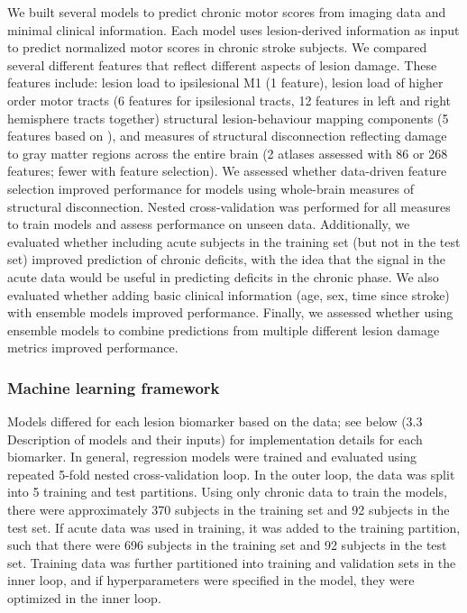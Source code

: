 \documentclass[phd,tocprelim]{cornell}
\begin{document}
We built several models to predict chronic motor scores from imaging data and minimal clinical information. Each model uses lesion-derived information as input to predict normalized motor scores in chronic stroke subjects. We compared several different features that reflect different aspects of lesion damage. These features include: lesion load to ipsilesional M1 (1 feature), lesion load of higher order motor tracts (6 features for ipsilesional tracts, 12 features in left and right hemisphere tracts together) structural lesion-behaviour mapping components (5 features based on \cite{Bowren2022-rs}), and measures of structural disconnection reflecting damage to gray matter regions across the entire brain (2 atlases assessed with 86 or 268 features; fewer with feature selection). We assessed whether data-driven feature selection improved performance for models using whole-brain measures of structural disconnection. Nested cross-validation was performed for all measures to train models and assess performance on unseen data.  Additionally, we evaluated whether including acute subjects in the training set (but not in the test set) improved prediction of chronic deficits, with the idea that the signal in the acute data would be useful in predicting deficits in the chronic phase. We also evaluated whether adding basic clinical information (age, sex, time since stroke) with ensemble models improved performance. Finally, we assessed whether using ensemble models to combine predictions from multiple different lesion damage metrics improved performance.

\subsubsection{Machine learning framework}
Models differed for each lesion biomarker based on the data; see below (3.3 Description of models and their inputs) for implementation details for each biomarker. In general, regression models were trained and evaluated using repeated 5-fold nested cross-validation loop.  In the outer loop, the data was split into 5 training and test partitions. Using only chronic data to train the models, there were approximately 370 subjects in the training set and 92 subjects in the test set. If acute data was used in training, it was added to the training partition, such that there were 696 subjects in the training set and 92 subjects in the test set. Training data was further partitioned into training and validation sets in the inner loop, and if hyperparameters were specified in the model, they were optimized in the inner loop. 
\end{document}
